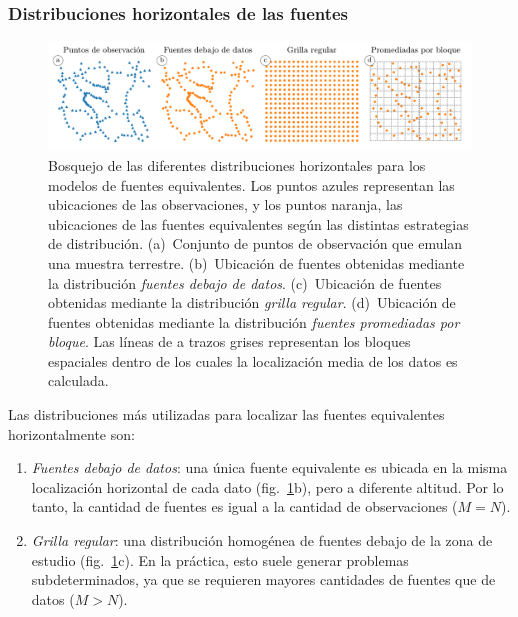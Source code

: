 \subsubsection{Distribuciones horizontales de las fuentes}

\begin{figure}[tb]
    \includegraphics[width=\linewidth]{figs/eql-gradient-boosted/source-layouts-schematics.pdf}
    \caption{
        Bosquejo de las diferentes distribuciones horizontales para los modelos
        de fuentes equivalentes.
        Los puntos azules representan las ubicaciones de las observaciones,
        y los puntos naranja, las ubicaciones de las fuentes equivalentes según
        las distintas estrategias de distribución.
        (a)~Conjunto de \SourceLayoutsSchematicsObservations{} puntos de
        observación que emulan una muestra terrestre.
        (b)~Ubicación de \SourceLayoutsSchematicsSourceBelowData{} fuentes
        obtenidas mediante la distribución \emph{fuentes debajo de datos}.
        (c)~Ubicación de \SourceLayoutsSchematicsGridSources{} fuentes
        obtenidas mediante la distribución \emph{grilla regular}.
        (d)~Ubicación de \SourceLayoutsSchematicsBlockAveragedSources{} fuentes
        obtenidas mediante la distribución \emph{fuentes promediadas por bloque}.
        Las líneas de a trazos grises representan los bloques espaciales dentro
        de los cuales la localización media de los datos es calculada.
    }
    \label{fig:source_layouts}
\end{figure}

Las distribuciones más utilizadas para localizar las fuentes equivalentes
horizontalmente son:

\begin{enumerate}
  \item
    \emph{Fuentes debajo de datos}: una única fuente equivalente es ubicada en
    la misma localización horizontal de cada dato
    (fig.~\ref{fig:source_layouts}b), pero a diferente altitud. Por lo tanto,
    la cantidad de fuentes es igual a la cantidad de observaciones ($M=N$).
  \item
    \emph{Grilla regular}: una distribución homogénea de fuentes debajo de la
    zona de estudio (fig.~\ref{fig:source_layouts}c). En la práctica, esto
    suele generar problemas subdeterminados, ya que se requieren mayores
    cantidades de fuentes que de datos ($M>N$).
\end{enumerate}

